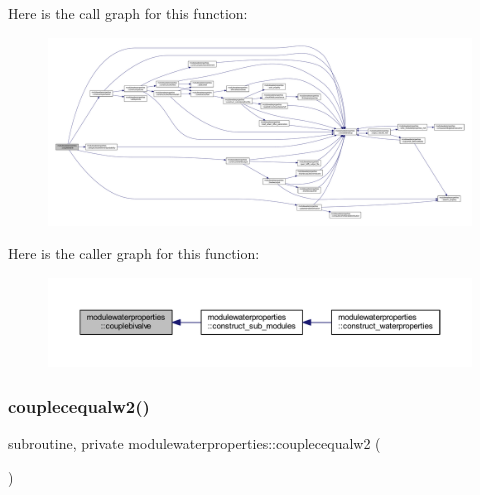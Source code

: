 Here is the call graph for this function\+:\nopagebreak
\begin{figure}[H]
\begin{center}
\leavevmode
\includegraphics[width=350pt]{namespacemodulewaterproperties_ab7e6de4d55639d85393ee68b800ba784_cgraph}
\end{center}
\end{figure}
Here is the caller graph for this function\+:\nopagebreak
\begin{figure}[H]
\begin{center}
\leavevmode
\includegraphics[width=350pt]{namespacemodulewaterproperties_ab7e6de4d55639d85393ee68b800ba784_icgraph}
\end{center}
\end{figure}
\mbox{\label{namespacemodulewaterproperties_a7478a221b172ba61186f09416e5b3b0d}} 
\subsubsection{\texorpdfstring{couplecequalw2()}{couplecequalw2()}}
{\footnotesize\ttfamily subroutine, private modulewaterproperties\+::couplecequalw2 (\begin{DoxyParamCaption}{ }\end{DoxyParamCaption})\hspace{0.3cm}{\ttfamily [private]}}

